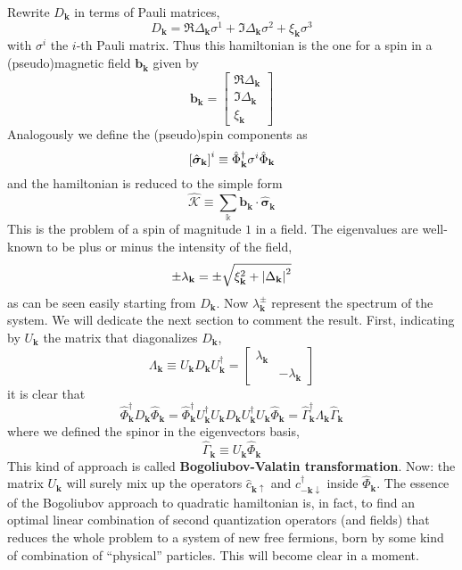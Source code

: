 Rewrite $D_\mathbf{k}$ in terms of Pauli matrices,
\[
	D_\mathbf{k} = \Re{\Delta_\mathbf{k}} \sigma^1 + \Im{\Delta_\mathbf{k}} \sigma^2 + \xi_\mathbf{k} \sigma^3
\]
with $\sigma^i$ the $i$-th Pauli matrix. Thus this hamiltonian is the one for a spin in a (pseudo)magnetic field $\mathbf{b}_\mathbf{k}$ given by
\[
	\mathbf{b}_\mathbf{k} = \begin{bmatrix}
		\Re{\Delta_\mathbf{k}} \\ \Im{\Delta_\mathbf{k}} \\ \xi_\mathbf{k}
	\end{bmatrix}
\]
Analogously we define the (pseudo)spin components as
\[
	\left[{\hat{\bm{\sigma}}_\mathbf{k}}\right]^i \equiv \hat{\Phi}_\mathbf{k}^\dagger \sigma^i \hat{\Phi}_\mathbf{k}
\]
and the hamiltonian is reduced to the simple form
\[
	\hat{\mathcal{K}} \equiv \sum_\mathbb{k} \mathbf{b}_\mathbf{k} \cdot \hat{\bm{\sigma}}_\mathbf{k}
\]
This is the problem of a spin of magnitude $1$ in a field.
The eigenvalues are well-known to be plus or minus the intensity of the field,
\[
	\pm \lambda_\mathbf{k} = \pm \sqrt{\xi_\mathbf{k}^2 + \abs{\Delta_\mathbf{k}}^2}
\]
as can be seen easily starting from $D_\mathbf{k}$.
Now $\lambda_\mathbf{k}^\pm$ represent the spectrum of the system. We will dedicate the next section to comment the result. First, indicating by $U_\mathbf{k}$ the matrix that diagonalizes $D_\mathbf{k}$,
\[
	\Lambda_\mathbf{k} \equiv
	U_\mathbf{k} D_\mathbf{k} U_\mathbf{k}^\dagger = \begin{bmatrix}
		\lambda_\mathbf{k} & \\
		& -\lambda_\mathbf{k}
	\end{bmatrix}
\]
it is clear that
\[
	\hat{\Phi}_\mathbf{k}^\dagger D_\mathbf{k} \hat{\Phi}_\mathbf{k} = \hat{\Phi}_\mathbf{k}^\dagger U_\mathbf{k}^\dagger U_\mathbf{k} D_\mathbf{k} U_\mathbf{k}^\dagger U_\mathbf{k} \hat{\Phi}_\mathbf{k} = \hat{\Gamma}_\mathbf{k}^\dagger \Lambda_\mathbf{k} \hat{\Gamma}_\mathbf{k}
\]
where we defined the spinor in the eigenvectors basis,
\[
	\hat{\Gamma}_\mathbf{k} \equiv U_\mathbf{k} \hat{\Phi}_\mathbf{k}
\]
This kind of approach is called \textbf{Bogoliubov-Valatin transformation}.
Now: the matrix $U_\mathbf{k}$ will surely mix up the operators $\hat{c}_{\mathbf{k}\uparrow}$ and $\hat{c}_{-\mathbf{k}\downarrow}^\dagger$ inside $\hat{\Phi}_\mathbf{k}$. The essence of the Bogoliubov approach to quadratic hamiltonian is, in fact, to find an optimal linear combination of second quantization operators (and fields) that reduces the whole problem to a system of new free fermions, born by some kind of combination of ``physical'' particles. This will become clear in a moment.

